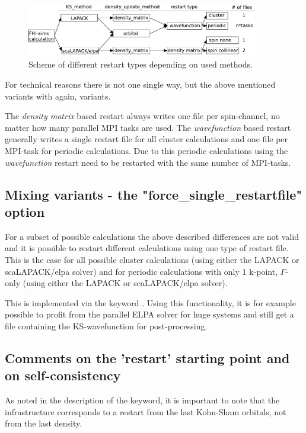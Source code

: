 \begin{figure}[hb]
  \centering
  \includegraphics[width=0.9\textwidth]{./imgs/restart_scheme}
  \caption{Scheme of different restart types depending on used methods.}
  \label{fig:restart_scheme}
\end{figure}

For technical reasons there is not one single way, but the above mentioned
variants with again, variants.

The \emph{density matrix} based restart always
writes one file per spin-channel, no matter how many parallel MPI tasks are
used.
The \emph{wavefunction} based restart generally writes a single restart file
for all cluster calculations and one file per MPI-task for periodic
calculations. Due to this periodic calculations using the \emph{wavefunction}
restart need to be restarted with the same number of MPI-tasks.

\subsection{Mixing variants - the "force\_single\_restartfile" option}
For a subset of possible calculations the above described differences are not
valid and it is possible to restart different calculations using one type of
restart file. This is the case for all possible cluster calculations (using
either the LAPACK or scaLAPACK/elpa solver) and for periodic calculations with
only 1 k-point, $\Gamma$-only (using either the LAPACK or scaLAPACK/elpa solver).

This is implemented via the keyword . Using
this functionality, it is for example possible to profit from the parallel ELPA
solver for huge systems and still get a file containing the KS-wavefunction for
post-processing.

\subsection{Comments on the 'restart' starting point and on self-consistency}
As noted in the description of the  keyword, 
it is important to note that the  infrastructure
corresponds to a restart from the last Kohn-Sham orbitals, not from
the last density. 

